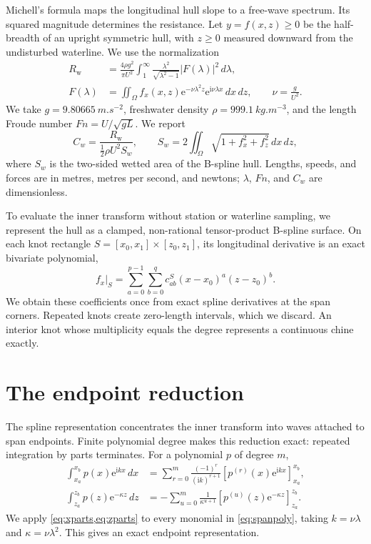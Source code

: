 \documentclass[10pt]{article}
\newcommand{\Fn}{\mathit{Fn}}
\newcommand{\iu}{\mathrm{i}}
\newcommand{\e}{\mathrm{e}}
\newcommand{\Rw}{R_{\mathrm{w}}}
\begin{document}
Michell's formula maps the longitudinal hull slope to a free-wave spectrum.
Its squared magnitude determines the resistance.  Let \(y=f(x,z)\geq0\) be the
half-breadth of an upright symmetric hull, with \(z\geq0\) measured downward
from the undisturbed waterline.  We use the normalization
\begin{align}
  \Rw &=\frac{4\rho g^2}{\pi U^2}
  \int_1^\infty \frac{\lambda^2}{\sqrt{\lambda^2-1}}
  \left|F(\lambda)\right|^2\,d\lambda,
  \label{eq:michell}\\
  F(\lambda) &= \iint_\Omega f_x(x,z)
  \e^{-\nu\lambda^2 z}\e^{\iu\nu\lambda x}\,dx\,dz,
  \qquad \nu=\frac{g}{U^2}.
  \label{eq:inner}
\end{align}
We take \(g=\SI{9.80665}{m.s^{-2}}\), freshwater density
\(\rho=\SI{999.1}{kg.m^{-3}}\), and the length Froude number
\(\Fn=U/\sqrt{gL}\).  We report
\begin{equation}
 C_w=\frac{\Rw}{\tfrac12\rho U^2 S_w},\qquad
 S_w=2\iint_\Omega\sqrt{1+f_x^2+f_z^2}\,dx\,dz,
 \label{eq:cw}
\end{equation}
where \(S_w\) is the two-sided wetted area of the B-spline hull.  Lengths,
speeds, and forces are in metres, metres per second, and newtons; \(\lambda\),
\(\Fn\), and \(C_w\) are dimensionless.

To evaluate the inner transform without station or waterline sampling, we
represent the hull as a clamped, non-rational tensor-product B-spline surface.
On each knot rectangle \(S=[x_0,x_1]\times[z_0,z_1]\), its longitudinal
derivative is an exact bivariate polynomial,
\begin{equation}
  f_x|_S=\sum_{a=0}^{p-1}\sum_{b=0}^{q}
  c^{S}_{ab}(x-x_0)^a(z-z_0)^b.
  \label{eq:spanpoly}
\end{equation}
We obtain these coefficients once from exact spline derivatives at the span
corners.  Repeated knots create zero-length intervals, which we discard.  An
interior knot whose multiplicity equals the degree represents a continuous
chine exactly.

\section{The endpoint reduction}
\label{sec:endpoint}

The spline representation concentrates the inner transform into waves attached
to span endpoints.  Finite polynomial degree makes this reduction exact:
repeated integration by parts terminates.  For a polynomial \(p\) of degree
\(m\),
\begin{align}
 \int_{x_a}^{x_b} p(x)\e^{\iu kx}\,dx
 &=\sum_{r=0}^{m}\frac{(-1)^r}{(\iu k)^{r+1}}
   \left[p^{(r)}(x)\e^{\iu kx}\right]_{x_a}^{x_b},
 \label{eq:xparts}\\
 \int_{z_a}^{z_b} p(z)\e^{-\kappa z}\,dz
 &=-\sum_{u=0}^{m}\frac{1}{\kappa^{u+1}}
   \left[p^{(u)}(z)\e^{-\kappa z}\right]_{z_a}^{z_b}.
 \label{eq:zparts}
\end{align}
We apply \cref{eq:xparts,eq:zparts} to every monomial in
\cref{eq:spanpoly}, taking \(k=\nu\lambda\) and
\(\kappa=\nu\lambda^2\).  This gives an exact endpoint representation.
\end{document}
